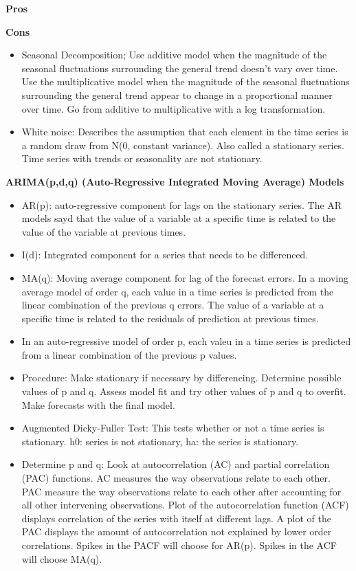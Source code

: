 \documentclass[]{book}
\theoremstyle{definition}
\theoremstyle{definition}
\theoremstyle{definition}
\theoremstyle{remark}
\begin{document}
\textbf{Pros}

\textbf{Cons}

\begin{itemize}
\item
  Seasonal Decomposition; Use additive model when the magnitude of the
  seasonal fluctuations surrounding the general trend doesn't vary over
  time. Use the multiplicative model when the magnitude of the seasonal
  fluctuations surrounding the general trend appear to change in a
  proportional manner over time. Go from additive to multiplicative with
  a log transformation.
\item
  White noise: Describes the assumption that each element in the time
  series is a random draw from N(0, constant variance). Also called a
  stationary series. Time series with trends or seasonality are not
  stationary.
\end{itemize}

\textbf{ARIMA(p,d,q) (Auto-Regressive Integrated Moving Average) Models}

\begin{itemize}
\item
  AR(p): auto-regressive component for lags on the stationary series.
  The AR models sayd that the value of a variable at a specific time is
  related to the value of the variable at previous times.
\item
  I(d): Integrated component for a series that needs to be differenced.
\item
  MA(q): Moving average component for lag of the forecast errors. In a
  moving average model of order q, each value in a time series is
  predicted from the linear combination of the previous q errors. The
  value of a variable at a specific time is related to the residuals of
  prediction at previous times.
\item
  In an auto-regressive model of order p, each valeu in a time series is
  predicted from a linear combination of the previous p values.
\item
  Procedure: Make stationary if necessary by differencing. Determine
  possible values of p and q. Assess model fit and try other values of p
  and q to overfit. Make forecasts with the final model.
\item
  Augmented Dicky-Fuller Test: This tests whether or not a time series
  is stationary. h0: series is not stationary, ha: the series is
  stationary.
\item
  Determine p and q: Look at autocorrelation (AC) and partial
  correlation (PAC) functions. AC measures the way observations relate
  to each other. PAC measure the way observations relate to each other
  after accounting for all other intervening observations. Plot of the
  autocorrelation function (ACF) displays correlation of the series with
  itself at different lags. A plot of the PAC displays the amount of
  autocorrelation not explained by lower order correlations. Spikes in
  the PACF will choose for AR(p). Spikes in the ACF will choose MA(q).
\end{itemize}
\end{document}
